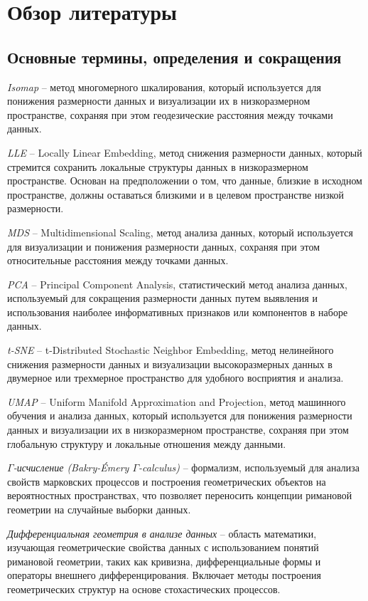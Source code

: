 \documentclass[a4paper,12pt]{extarticle}
\begin{document}
\section{Обзор литературы}

\subsection{Основные термины, определения и сокращения}

\textit{Isomap} – метод многомерного шкалирования, который используется для понижения размерности данных и визуализации их в низкоразмерном пространстве, сохраняя при этом геодезические расстояния между точками данных.

\textit{LLE} – Locally Linear Embedding, метод снижения размерности данных, который стремится сохранить локальные структуры данных в низкоразмерном пространстве. Основан на предположении о том, что данные, близкие в исходном пространстве, должны оставаться близкими и в целевом пространстве низкой размерности.

\textit{MDS} – Multidimensional Scaling, метод анализа данных, который используется для визуализации и понижения размерности данных, сохраняя при этом относительные расстояния между точками данных.

\textit{PCA} – Principal Component Analysis, статистический метод анализа данных, используемый для сокращения размерности данных путем выявления и использования наиболее информативных признаков или компонентов в наборе данных.

\textit{t-SNE} – t-Distributed Stochastic Neighbor Embedding, метод нелинейного снижения размерности данных и визуализации высокоразмерных данных в двумерное или трехмерное пространство для удобного восприятия и анализа.

\textit{UMAP} – Uniform Manifold Approximation and Projection, метод машинного обучения и анализа данных, который используется для понижения размерности данных и визуализации их в низкоразмерном пространстве, сохраняя при этом глобальную структуру и локальные отношения между данными.

\textit{{$\Gamma$}-исчисление (Bakry-Émery {$\Gamma$}-calculus)} – формализм, используемый для анализа свойств марковских процессов и построения геометрических объектов на вероятностных пространствах, что позволяет переносить концепции римановой геометрии на случайные выборки данных.

\textit{Дифференциальная геометрия в анализе данных} – область математики, изучающая геометрические свойства данных с использованием понятий римановой геометрии, таких как кривизна, дифференциальные формы и операторы внешнего дифференцирования. Включает методы построения геометрических структур на основе стохастических процессов.
\end{document}
